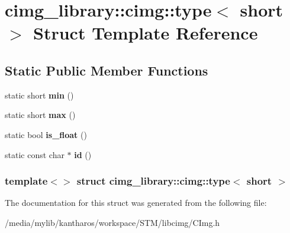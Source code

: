 \hypertarget{structcimg__library_1_1cimg_1_1type_3_01short_01_4}{
\section{cimg\_\-library::cimg::type$<$ short $>$ Struct Template Reference}
\label{structcimg__library_1_1cimg_1_1type_3_01short_01_4}
}
\subsection*{Static Public Member Functions}
\begin{DoxyCompactItemize}
\item 
\hypertarget{structcimg__library_1_1cimg_1_1type_3_01short_01_4_ad178d7c70c2e58cd4ed8f72278b71d75}{
static short {\bfseries min} ()}
\label{structcimg__library_1_1cimg_1_1type_3_01short_01_4_ad178d7c70c2e58cd4ed8f72278b71d75}

\item 
\hypertarget{structcimg__library_1_1cimg_1_1type_3_01short_01_4_abaebbd85de3efd01551f44bef24af2c0}{
static short {\bfseries max} ()}
\label{structcimg__library_1_1cimg_1_1type_3_01short_01_4_abaebbd85de3efd01551f44bef24af2c0}

\item 
\hypertarget{structcimg__library_1_1cimg_1_1type_3_01short_01_4_a4e7b2132b699c741e24002f2cf0646d1}{
static bool {\bfseries is\_\-float} ()}
\label{structcimg__library_1_1cimg_1_1type_3_01short_01_4_a4e7b2132b699c741e24002f2cf0646d1}

\item 
\hypertarget{structcimg__library_1_1cimg_1_1type_3_01short_01_4_af065c0d16f10b882d305b8429036aa81}{
static const char $\ast$ {\bfseries id} ()}
\label{structcimg__library_1_1cimg_1_1type_3_01short_01_4_af065c0d16f10b882d305b8429036aa81}

\end{DoxyCompactItemize}
\subsubsection*{template$<$$>$ struct cimg\_\-library::cimg::type$<$ short $>$}



The documentation for this struct was generated from the following file:\begin{DoxyCompactItemize}
\item 
/media/mylib/kantharos/workspace/STM/libcimg/CImg.h\end{DoxyCompactItemize}
